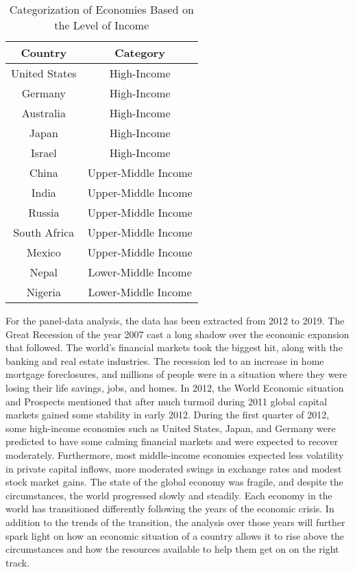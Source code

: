 \begin{table}[h!]
    \centering
    \begin{tabular}{|c|c|}
    \hline
    \textbf{Country } & \textbf{Category} \\ [0.5ex] 
 \hline\hline
 United States & High-Income \\ 
 \hline
 Germany & High-Income \\
 \hline
 Australia & High-Income \\
 \hline
 Japan & High-Income \\
 \hline
 Israel & High-Income \\
  \hline
 China & Upper-Middle Income \\
 \hline
 India & Upper-Middle Income \\
 \hline
 Russia & Upper-Middle Income \\
 \hline
 South Africa & Upper-Middle Income \\
  \hline
 Mexico & Upper-Middle Income \\
 \hline
 Nepal & Lower-Middle Income \\
 \hline
 Nigeria & Lower-Middle Income \\
 \hline
    \end{tabular}
    \caption{Categorization of Economies Based on the Level of Income}
    \label{tab:my_label}
\end{table}

For the panel-data analysis, the data has been extracted from 2012 to 2019. The Great Recession of the year 2007 cast a long shadow over the economic expansion that followed. The world’s financial markets took the biggest hit, along with the banking and real estate industries. The recession led to an increase in home mortgage foreclosures, and millions of people were in a situation where they were losing their life savings, jobs, and homes. In 2012, the World Economic situation and Prospects mentioned that after much turmoil during 2011 global capital markets gained some stability in early 2012. During the first quarter of 2012, some high-income economies such as United States, Japan, and Germany were predicted to have some calming financial markets and were expected to recover moderately. Furthermore, most middle-income economies expected less volatility in private capital inflows, more moderated swings in exchange rates and modest stock market gains. The state of the global economy was fragile, and despite the circumstances, the world progressed slowly and steadily. Each economy in the world has transitioned differently following the years of the economic crisis. In addition to the trends of the transition, the analysis over those years will further spark light on how an economic situation of a country allows it to rise above the circumstances and how the resources available to help them get on on the right track.

